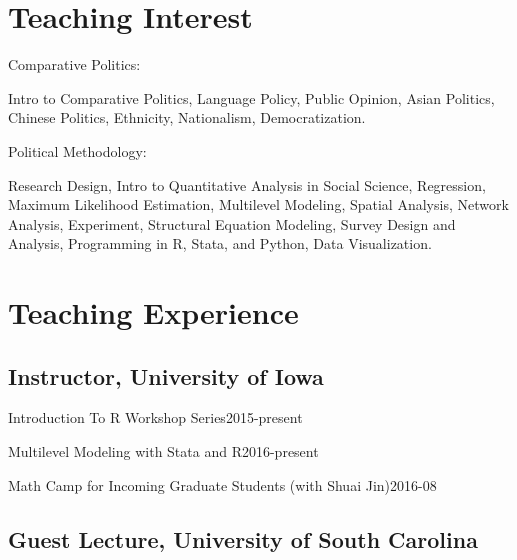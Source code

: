 \documentclass[10.5pt,]{article}
\providecommand{\tightlist}{%
  \setlength{\itemsep}{0pt}\setlength{\parskip}{0pt}}
\renewenvironment{itemize}{
  \begin{list}{}{
    \setlength{\leftmargin}{1.5em}
  }
}{
  \end{list}
}
\begin{document}
\section{Teaching Interest}\label{teaching-interest}

\begin{itemize}
\tightlist
\item
  Comparative Politics:

  \begin{itemize}
  \tightlist
  \item
    Intro to Comparative Politics, Language Policy, Public Opinion,
    Asian Politics, Chinese Politics, Ethnicity, Nationalism,
    Democratization.
  \end{itemize}
\item
  Political Methodology:

  \begin{itemize}
  \tightlist
  \item
    Research Design, Intro to Quantitative Analysis in Social Science,
    Regression, Maximum Likelihood Estimation, Multilevel Modeling,
    Spatial Analysis, Network Analysis, Experiment, Structural Equation
    Modeling, Survey Design and Analysis, Programming in R, Stata, and
    Python, Data Visualization.
  \end{itemize}
\end{itemize}

\section{Teaching Experience}\label{teaching-experience}

\subsection{Instructor, University of
Iowa}\label{instructor-university-of-iowa}

\begin{itemize}
\tightlist
\item
  Introduction To R Workshop Series\hfill 2015-present
\item
  Multilevel Modeling with Stata and R\hfill 2016-present
\item
  Math Camp for Incoming Graduate Students (with Shuai
  Jin)\hfill 2016-08
\end{itemize}

\subsection{Guest Lecture, University of South
Carolina}\label{guest-lecture-university-of-south-carolina}
\end{document}
